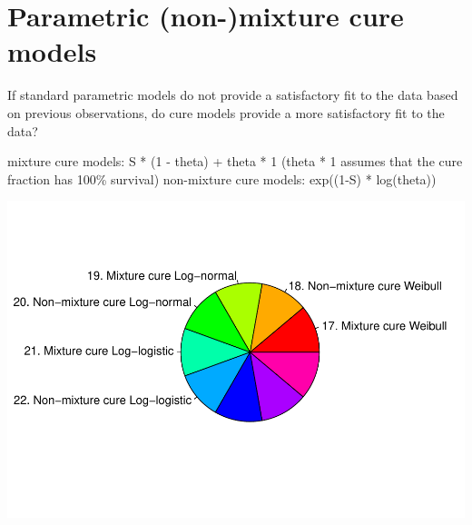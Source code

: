 \documentclass[]{article}
\begin{document}
\newpage

\section{Parametric (non-)mixture cure
models}\label{parametric-non-mixture-cure-models}

If standard parametric models do not provide a satisfactory fit to the
data based on previous observations, do cure models provide a more
satisfactory fit to the data?

mixture cure models: S * (1 - theta) + theta * 1 (theta * 1 assumes that
the cure fraction has 100\% survival) non-mixture cure models: exp((1-S)
* log(theta))

\begin{flushleft}\includegraphics{Images/cure-1} \end{flushleft}
\end{document}
